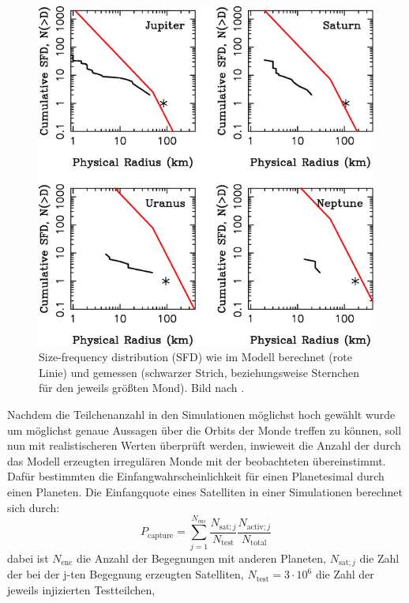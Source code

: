 \documentclass[12pt,a4paper,twoside]{article}
\renewcommand{\cite}{\citep}
\begin{document}
\begin{figure}[tbn]
\centering
\includegraphics[scale=2]{img/Nesvorny2007-9.jpg}
\caption{Size-frequency distribution (SFD) wie im Modell berechnet (rote Linie) und gemessen (schwarzer Strich, beziehungsweise Sternchen für den jeweils größten Mond). Bild nach \cite{Nesvorny2007}.}
\label{fig:SFD}
\end{figure}
Nachdem die Teilchenanzahl in den Simulationen möglichst hoch gewählt wurde um möglichst genaue Aussagen über die Orbits der Monde treffen zu können, %
soll nun mit realistischeren Werten überprüft werden, inwieweit die Anzahl der durch das Modell erzeugten irregulären Monde mit der beobachteten übereinstimmt.
Dafür bestimmten \cite{Nesvorny2007} die Einfangwahrscheinlichkeit für einen Planetesimal durch einen Planeten.
Die Einfangquote eines Satelliten in einer Simulationen berechnet sich durch:
\begin{equation}
P_{\mathrm{capture}} = \sum\limits^{N_{\mathrm{enc}}}_{j=1} \frac{N_{\mathrm{sat}; j}}{N_{\mathrm{test}}}\frac{N_{\mathrm{activ}; j}}{N_{\mathrm{total}}}
\end{equation} %
dabei ist $N_{\mathrm{enc}}$ die Anzahl der Begegnungen mit anderen Planeten, $N_{\mathrm{sat};j}$ die Zahl der bei der j-ten Begegnung erzeugten Satelliten, $N_{\mathrm{test}} = 3 \cdot 10^6$ die Zahl der jeweils injizierten Testteilchen, %
\end{document}
